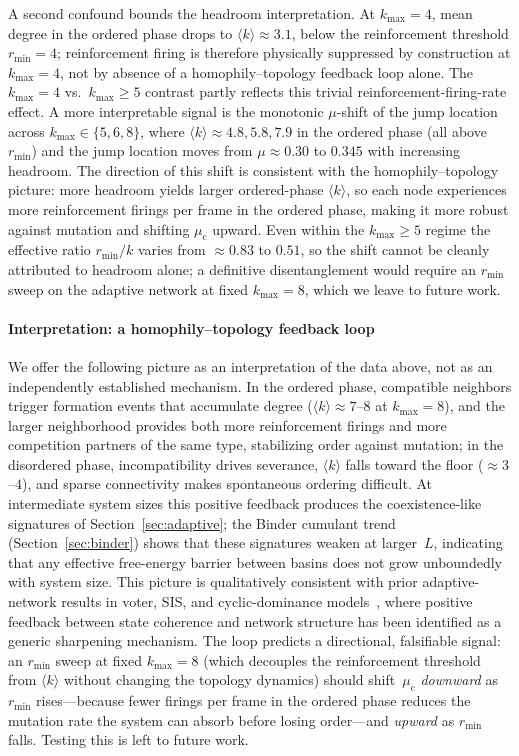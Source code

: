 \documentclass[preprint,12pt]{elsarticle}
\newcommand{\mc}{\mu_\mathrm{c}}      %
\newcommand{\kavg}{\langle k \rangle} %
\newcommand{\Lsys}{L}                 %
\newcommand{\rmin}{r_{\min}}           %
\newcommand{\kmax}{k_{\max}}           %
\begin{document}
A second confound bounds the headroom interpretation.
At $\kmax = 4$, mean degree in the ordered phase drops to
$\kavg \approx 3.1$, below the reinforcement threshold
$\rmin = 4$; reinforcement firing is therefore
physically suppressed by construction at $\kmax = 4$,
not by absence of a homophily--topology feedback loop
alone.
The $\kmax = 4$ vs.\ $\kmax \geq 5$ contrast partly
reflects this trivial reinforcement-firing-rate effect.
A more interpretable signal is the monotonic $\mu$-shift
of the jump location across $\kmax \in \{5, 6, 8\}$,
where $\kavg \approx 4.8, 5.8, 7.9$ in the ordered phase
(all above $\rmin$) and the jump location moves from
$\mu \approx 0.30$ to $0.345$ with increasing headroom.
The direction of this shift is consistent with the
homophily--topology picture: more headroom yields larger
ordered-phase $\kavg$, so each node experiences more
reinforcement firings per frame in the ordered phase,
making it more robust against mutation and shifting
$\mc$ upward.
Even within the $\kmax \geq 5$ regime the effective ratio
$\rmin/k$ varies from $\approx 0.83$ to $0.51$, so the
shift cannot be cleanly attributed to headroom alone;
a definitive disentanglement would require an
$\rmin$ sweep on the adaptive network at fixed
$\kmax = 8$, which we leave to future work.

\paragraph{Interpretation: a homophily--topology feedback loop}
We offer the following picture as an interpretation of the data
above, not as an independently established mechanism.
In the ordered phase, compatible neighbors trigger formation
events that accumulate degree ($\kavg \approx 7$--$8$ at
$\kmax = 8$), and the larger neighborhood provides both more
reinforcement firings and more competition partners of the
same type, stabilizing order against mutation;
in the disordered phase, incompatibility drives severance,
$\kavg$ falls toward the floor ($\approx 3$--$4$), and sparse
connectivity makes spontaneous ordering difficult.
At intermediate system sizes this positive feedback produces
the coexistence-like signatures of
Section~\ref{sec:adaptive}; the Binder cumulant trend
(Section~\ref{sec:binder}) shows that these signatures weaken
at larger~$\Lsys$, indicating that any effective free-energy
barrier between basins does not grow unboundedly with system
size.
This picture is qualitatively consistent with prior
adaptive-network results in voter, SIS, and cyclic-dominance
models~\cite{holme2006nonequilibrium,vazquez2008generic,gross2006epidemic,min2017fragmentation,marceau2010adaptive,demirel2011cyclic,durrett2012graph},
where positive feedback between state coherence and network
structure has been identified as a generic sharpening
mechanism.
The loop predicts a directional, falsifiable signal: an
$\rmin$ sweep at fixed $\kmax = 8$ (which decouples the
reinforcement threshold from $\kavg$ without changing the
topology dynamics) should shift~$\mc$ \emph{downward} as
$\rmin$ rises---because fewer firings per frame in the
ordered phase reduces the mutation rate the system can
absorb before losing order---and \emph{upward} as $\rmin$
falls.
Testing this is left to future work.
\end{document}
